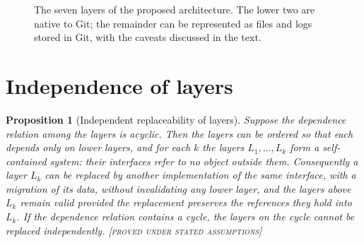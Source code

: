 \documentclass[11pt,twoside,openright]{book}
\theoremstyle{plain}
\newtheorem{proposition}[theorem]{Proposition}
\theoremstyle{definition}
\theoremstyle{remark}
\newcommand{\Proved}{\textup{\textsc{[proved under stated assumptions]}}}
\begin{document}
\begin{figure}[t]
\centering
{}
\caption{The seven layers of the proposed architecture. The lower two are native to Git; the remainder can be represented as files and logs stored in Git, with the caveats discussed in the text.}
\label{fig:sevenlayers}
\end{figure}

\section{Independence of layers}

\begin{proposition}[Independent replaceability of layers]\label{prop:replace}
Suppose the dependence relation among the layers is acyclic. Then the layers can be ordered so that each depends only on lower layers, and for each $k$ the layers $L_1,\dots,L_k$ form a self-contained system: their interfaces refer to no object outside them. Consequently a layer $L_k$ can be replaced by another implementation of the same interface, with a migration of its data, without invalidating any lower layer, and the layers above $L_k$ remain valid provided the replacement preserves the references they hold into $L_k$. If the dependence relation contains a cycle, the layers on the cycle cannot be replaced independently.
\Proved{}
\end{proposition}
\end{document}
